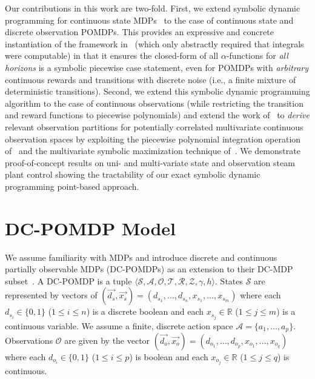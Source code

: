 \documentclass{article} %
\begin{document}
Our contributions in this work are two-fold.  First, we extend
symbolic dynamic programming for continuous state
MDPs~\cite{sanner_uai11} to the case of continuous state and discrete
observation POMDPs.  This provides an expressive and concrete
instantiation of the framework in~\cite{Perseus_cont} (which only
abstractly required that integrals were computable) in that it ensures
the closed-form of all $\alpha$-functions for \emph{all horizons} is a
symbolic piecewise case statement, even for POMDPs with
\emph{arbitrary} continuous rewards and transitions with discrete
noise (i.e., a finite mixture of deterministic transitions).  
Second, we extend this symbolic dynamic programming algorithm
to the case of continuous observations (while restricting the
transition and reward functions to piecewise polynomials) and extend
the work of~\cite{pascal_ijcai05} to \emph{derive} relevant observation
partitions for potentially correlated multivariate continuous
observation spaces by exploiting the piecewise polynomial integration
operation of~\cite{sanner_aaai12} and the multivariate symbolic maximization
technique of~\cite{sanner_uai11}.  
We demonstrate
proof-of-concept results on uni- and multi-variate state and
observation steam plant control showing the tractability of our
exact symbolic dynamic programming point-based approach.



\section{DC-POMDP Model} 

We assume familiarity with MDPs and introduce discrete and continuous
partially observable MDPs (DC-POMDPs) as an extension to their DC-MDP
subset~\cite{sanner_uai11}.  A DC-POMDP is a tuple $\langle
\mathcal{S},\mathcal{A},\mathcal{O},\mathcal{T},\mathcal{R},\mathcal{Z},\gamma,h
\rangle$.  States $\mathcal{S}$ are represented by vectors of
$(\vec{d_s},\vec{x_s}) = (
d_{s_1},\ldots,d_{s_n},x_{s_1},\ldots,x_{s_m} )$ where each $d_{s_i}
\in \{ 0,1 \}$ ($1 \leq i \leq n$) is a discrete boolean and each
$x_{s_j} \in \mathbb{R}$ ($1 \leq j \leq m$) is a continuous variable.
We assume a finite, discrete action space $\mathcal{A} = \{ a_1,
\ldots, a_p \}$. Observations
$\mathcal{O}$ are given by the vector $(\vec{d_o},\vec{x_o}) = (
d_{o_1},\ldots,d_{o_p},x_{o_1},\ldots,x_{o_q} )$ where each $d_{o_i}
\in \{ 0,1 \}$ ($1 \leq i \leq p$) is boolean and each $x_{o_j} \in
\mathbb{R}$ ($1 \leq j \leq q$) is continuous.
\end{document}
